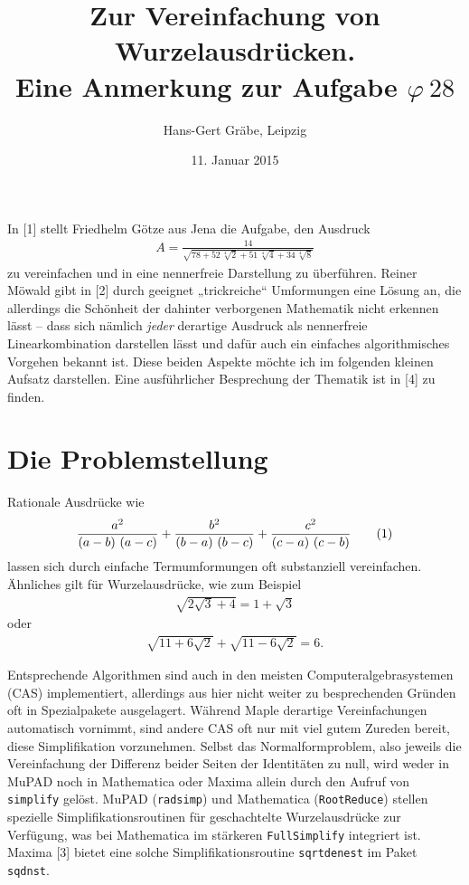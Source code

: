 \documentclass[11pt,a4paper]{article}
\author{Hans-Gert Gräbe, Leipzig}
\title{Zur Vereinfachung von Wurzelausdrücken.\\ 
Eine Anmerkung zur Aufgabe $\varphi\ 28$\kosemnetlicensemark}
\date{11. Januar 2015}
\newcommand{\cas}[1]{{\sc #1}}
\begin{document}
 
\maketitle 

In [1] stellt Friedhelm Götze aus Jena die Aufgabe, den Ausdruck 
\begin{gather*}
  A=\frac{14}{\sqrt{78+52\,\sqrt[4]{2}+51\,\sqrt[4]{4}+34\,\sqrt[4]{8}}}
\end{gather*}
zu vereinfachen und in eine nennerfreie Darstellung zu überführen. Reiner
Möwald gibt in [2] durch geeignet „trickreiche“ Umformungen eine Lösung an, die
allerdings die Schönheit der dahinter verborgenen Mathematik nicht erkennen
lässt -- dass sich nämlich \emph{jeder} derartige Ausdruck als nennerfreie
Linearkombination darstellen lässt und dafür auch ein einfaches algorithmisches
Vorgehen bekannt ist. Diese beiden Aspekte möchte ich im folgenden kleinen
Aufsatz darstellen.  Eine ausführlicher Besprechung der Thematik ist in [4] zu
finden.

\section{Die Problemstellung}

Rationale Ausdrücke wie 
\begin{gather*}
  \frac{a^2}{\left(a-b\right)\,\left(a-c\right)} + \frac{b^2}{\left(b-a\right)\,\left(b-c\right)} +
  \frac{c^2}{\left(c-a\right)\,\left(c-b\right)}\tag{1}
\end{gather*}     
lassen sich durch einfache Termumformungen oft substanziell vereinfachen.
Ähnliches gilt für Wurzelausdrücke, wie zum Beispiel 
\begin{gather*}
  \sqrt{2\sqrt{3}+4}=1+\sqrt{3}\tag{2}
\end{gather*}
oder 
\begin{gather*}
  \sqrt{11+6\sqrt{2}}+\sqrt{11-6\sqrt{2}} = 6\tag{3}.
\end{gather*}

Entsprechende Algorithmen sind auch in den meisten Computeralgebrasystemen
(CAS) implementiert, allerdings aus hier nicht weiter zu besprechenden Gründen
oft in Spezialpakete ausgelagert.  Während \cas{Maple} derartige
Vereinfachungen automatisch vornimmt, sind andere CAS oft nur mit viel gutem
Zureden bereit, diese Simplifikation vorzunehmen. Selbst das Normalformproblem,
also jeweils die Vereinfachung der Differenz beider Seiten der Identitäten zu
null, wird weder in \cas{MuPAD} noch in \cas{Mathematica} oder \cas{Maxima}
allein durch den Aufruf von \texttt{simplify} gelöst. \cas{MuPAD}
(\texttt{radsimp}) und \cas{Mathematica} (\texttt{RootReduce}) stellen
spezielle Simplifikationsroutinen für geschachtelte Wurzelausdrücke zur
Verfügung, was bei \cas{Mathematica} im stärkeren \texttt{FullSimplify}
integriert ist. \cas{Maxima} [3] bietet eine solche Simplifikationsroutine
\texttt{sqrtdenest} im Paket \texttt{sqdnst}.  
\end{document}
